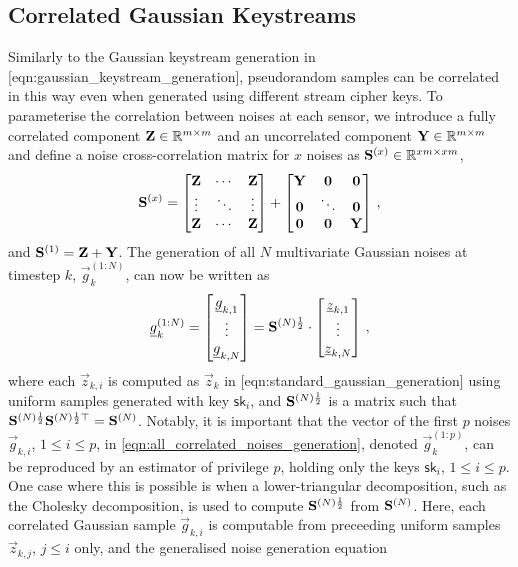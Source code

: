 \subsection{Correlated Gaussian Keystreams}\label{subsec:priv_estimation:fus_gaussian_keystreams}
Similarly to the Gaussian keystream generation in [eqn:gaussian\_keystream\_generation], pseudorandom samples can be correlated in this way even when generated using different stream cipher keys. To parameterise the correlation between noises at each sensor, we introduce a fully correlated component ${{\mathbf{Z}}}\in\mathbb{R}^{m\times m}$ and an uncorrelated component ${{\mathbf{Y}}}\in\mathbb{R}^{m\times m}$ and define a noise cross-correlation matrix for $x$ noises as ${{\mathbf{S}}}^{(x)} \in \mathbb{R}^{xm\times xm}$,
\begin{equation}\label{eqn:noise_correlation_matrix}
  {\ensuremath{{\mathbf{S}}}}^{(x)}=
  \begin{bmatrix}
    {\ensuremath{{\mathbf{Z}}}} & \cdots & {{\mathbf{Z}}}\\
    \vdots & \ddots & \vdots\\
    {{\mathbf{Z}}} & \cdots & {{\mathbf{Z}}}\\
  \end{bmatrix}+
  \begin{bmatrix}
    {\ensuremath{{\mathbf{Y}}}} & {{\mathbf{0}}} & {{\mathbf{0}}}\\
    {{\mathbf{0}}} & \ddots & {{\mathbf{0}}}\\
    {{\mathbf{0}}} & {{\mathbf{0}}} & {{\mathbf{Y}}}\\
  \end{bmatrix}\,,
\end{equation}
and ${{\mathbf{S}}}^{(1)}={{\mathbf{Z}}}+{{\mathbf{Y}}}$. The generation of all $N$ multivariate Gaussian noises at timestep $k$, $\vec{g}_k^{(1:N)}$, can now be written as
\begin{equation}\label{eqn:all_correlated_noises_generation}
  {\underline{g}}_k^{(1:N)}=
  \begin{bmatrix}
    {\underline{g}}_{k,1}\\
    \vdots\\
    {\underline{g}}_{k,N}
  \end{bmatrix}=
  {{\mathbf{S}}}^{(N)\frac{1}{2}}\cdot
  \begin{bmatrix}
    {\underline{z}}_{k,1}\\
    \vdots\\
    {\underline{z}}_{k,N}
  \end{bmatrix}\,,
\end{equation}
where each $\vec{z}_{k,i}$ is computed as $\vec{z}_k$ in [eqn:standard\_gaussian\_generation] using uniform samples generated with key $\mathsf{sk}_i$, and ${{\mathbf{S}}}^{(N)\frac{1}{2}}$ is a matrix such that ${{\mathbf{S}}}^{(N)\frac{1}{2}}{{\mathbf{S}}}^{(N)\frac{1}{2}\top}={{\mathbf{S}}}^{(N)}$. Notably, it is important that the vector of the first $p$ noises $\vec{g}_{k,i}$, $1\leq i \leq p$, in \eqref{eqn:all_correlated_noises_generation}, denoted $\vec{g}_k^{(1:p)}$, can be reproduced by an estimator of privilege $p$, holding only the keys $\mathsf{sk}_i$, $1\leq i \leq p$. One case where this is possible is when a lower-triangular decomposition, such as the Cholesky decomposition, is used to compute ${{\mathbf{S}}}^{(N)\frac{1}{2}}$ from ${{\mathbf{S}}}^{(N)}$. Here, each correlated Gaussian sample $\vec{g}_{k,i}$ is computable from preceeding uniform samples $\vec{z}_{k,j}$, $j\leq i$ only, and the generalised noise generation equation
